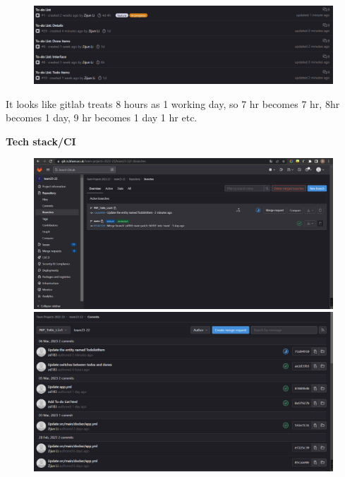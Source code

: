 \documentclass[peerreview]{IEEEtran}
\begin{document}
\begin{figure}[!h]
  \centering
  \includegraphics[width=1\columnwidth]{./images/Agile Estimation of Cards.png} 
  \label{fig_Agile}
\end{figure}

{\footnotesize It looks like gitlab treats 8 hours as 1 working day, so 7 hr becomes 7 hr, 8hr becomes 1 day, 9 hr becomes 1 day 1 hr etc.}

\newpage

{\Large\bf{Tech stack/CI}}\\

\begin{figure}[!h]
  \centering
  \includegraphics[width=1\columnwidth]{./images/MVP_1.png} 
  \includegraphics[width=1\columnwidth]{./images/MVP_2.png} 
  \label{fig_MVP_1}
\end{figure}
\end{document}
